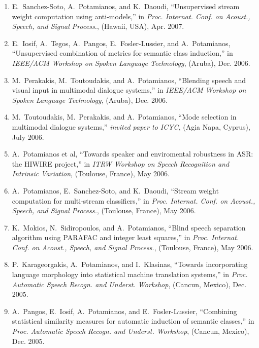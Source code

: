 \begin{enumerate}
\item
E.~Sanchez-Soto, A.~Potamianos, and K.~Daoudi, ``Unsupervised stream weight
  computation using anti-models,'' in {\em Proc. Internat. Conf. on Acoust.,
  Speech, and Signal Process.}, (Hawaii, USA), Apr. 2007.

\item
E.~Iosif, A.~Tegos, A.~Pangos, E.~Fosler-Lussier, and A.~Potamianos,
  ``Unsupervised combination of metrics for semantic class induction,'' in {\em
  IEEE/ACM Workshop on Spoken Language Technology}, (Aruba), Dec. 2006.

\item
M.~Perakakis, M.~Toutoudakis, and A.~Potamianos, ``Blending speech and visual
  input in multimodal dialogue systems,'' in {\em IEEE/ACM Workshop on Spoken
  Language Technology}, (Aruba), Dec. 2006.

\item
M.~Toutoudakis, M.~Perakakis, and A.~Potamianos, ``Mode selection in multimodal
  dialogue systems,'' {\em invited paper to ICYC}, (Agia Napa, Cyprus), July
  2006.

\item
A.~{Potamianos et al}, ``Towards speaker and enviromental robustness in {ASR}:
  the {HIWIRE} project,'' in {\em ITRW Workshop on Speech Recognition and
  Intrinsic Variation}, (Toulouse, France), May 2006.

\item
A.~Potamianos, E.~Sanchez-Soto, and K.~Daoudi, ``Stream weight computation for
  multi-stream classifiers,'' in {\em Proc. Internat. Conf. on Acoust., Speech,
  and Signal Process.}, (Toulouse, France), May 2006.

\item
K.~Mokios, N.~Sidiropoulos, and A.~Potamianos, ``Blind speech separation
  algorithm using {PARAFAC} and integer least squares,'' in {\em Proc.
  Internat. Conf. on Acoust., Speech, and Signal Process.}, (Toulouse, France),
  May 2006.

\item
P.~Karageorgakis, A.~Potamianos, and I.~Klasinas, ``Towards incorporating
  language morphology into statistical machine translation systems,'' in {\em
  Proc. Automatic Speech Recogn. and Underst. Workshop}, (Cancun, Mexico), Dec.
  2005.

\item
A.~Pangos, E.~Iosif, A.~Potamianos, and E.~Fosler-Lussier, ``Combining
  statistical similarity measures for automatic induction of semantic
  classes,'' in {\em Proc. Automatic Speech Recogn. and Underst. Workshop},
  (Cancun, Mexico), Dec. 2005.


\end{enumerate}
